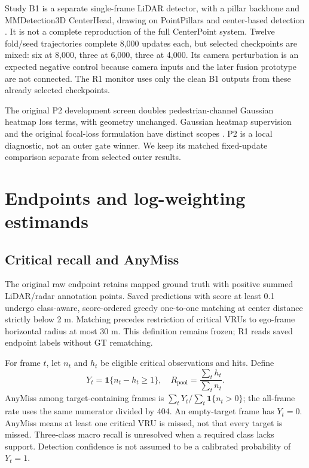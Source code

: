 \documentclass[conference]{IEEEtran}
\begin{document}
Study B1 is a separate single-frame LiDAR detector, with a pillar backbone and MMDetection3D CenterHead, drawing on PointPillars and center-based detection \cite{Lang2019PointPillars,Yin2021CenterPoint}. It is not a complete reproduction of the full CenterPoint system. Twelve fold/seed trajectories complete 8,000 updates each, but selected checkpoints are mixed: six at 8,000, three at 6,000, three at 4,000. Its camera perturbation is an expected negative control because camera inputs and the later fusion prototype are not connected. The R1 monitor uses only the clean B1 outputs from these already selected checkpoints.

The original P2 development screen doubles pedestrian-channel Gaussian heatmap loss terms, with geometry unchanged. Gaussian heatmap supervision and the original focal-loss formulation have distinct scopes \cite{Zhou2019Objects,Lin2017Focal}. P2 is a local diagnostic, not an outer gate winner. We keep its matched fixed-update comparison separate from selected outer results.

\section{Endpoints and log-weighting estimands}
\subsection{Critical recall and AnyMiss}
The original raw endpoint retains mapped ground truth with positive summed LiDAR/radar annotation points. Saved predictions with score at least 0.1 undergo class-aware, score-ordered greedy one-to-one matching at center distance strictly below 2 m. Matching precedes restriction of critical VRUs to ego-frame horizontal radius at most 30 m. This definition remains frozen; R1 reads saved endpoint labels without GT rematching.

For frame $t$, let $n_t$ and $h_t$ be eligible critical observations and hits. Define
\begin{equation}
Y_t=\mathbf{1}\{n_t-h_t\geq1\},\quad
R_{\mathrm{pool}}=\frac{\sum_t h_t}{\sum_t n_t}.
\end{equation}
AnyMiss among target-containing frames is $\sum_tY_t/\sum_t\mathbf{1}\{n_t>0\}$; the all-frame rate uses the same numerator divided by 404. An empty-target frame has $Y_t=0$. AnyMiss means at least one critical VRU is missed, not that every target is missed. Three-class macro recall is unresolved when a required class lacks support. Detection confidence is not assumed to be a calibrated probability of $Y_t=1$.
\end{document}
